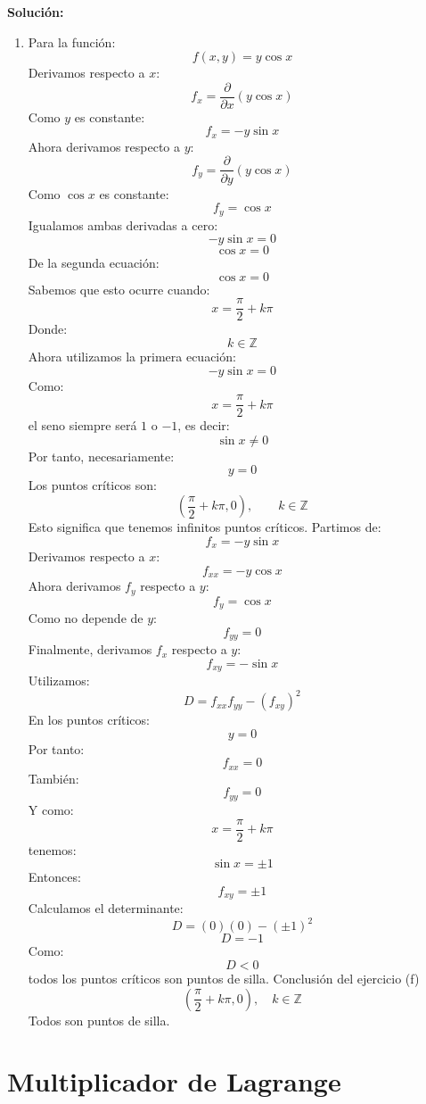 \documentclass[12pt,a4paper]{report}
\newcommand{\solutionname}{Solución:}
\newenvironment{solution}{
 	\par\noindent\textbf{\color{structurecolor}\solutionname}
 	\color{black!90}}{\hfill\quad\par}
\begin{document}
\begin{solution}
\begin{enumerate}
\item[f)] Para la función:
\[
f(x,y)=y\cos x
\]
Derivamos respecto a \(x\):
\[
f_x=\frac{\partial}{\partial x}(y\cos x)
\]
Como \(y\) es constante:
\[
f_x=-y\sin x
\]
Ahora derivamos respecto a \(y\):
\[
f_y=\frac{\partial}{\partial y}(y\cos x)
\]
Como \(\cos x\) es constante:
\[
f_y=\cos x
\]
Igualamos ambas derivadas a cero:
\[
-y\sin x=0
\]
\[
\cos x=0
\]
De la segunda ecuación:
\[
\cos x=0
\]
Sabemos que esto ocurre cuando:
\[
x=\frac{\pi}{2}+k\pi
\]
Donde:
\[
k\in\mathbb Z
\]
Ahora utilizamos la primera ecuación:
\[
-y\sin x=0
\]
Como:
\[
x=\frac{\pi}{2}+k\pi
\]
el seno siempre será \(1\) o \(-1\), es decir:
\[
\sin x\neq0
\]
Por tanto, necesariamente:
\[
y=0
\]
Los puntos críticos son:
\[
\left(\frac{\pi}{2}+k\pi,0\right),
\qquad k\in\mathbb Z
\]
Esto significa que tenemos infinitos puntos críticos.
Partimos de:
\[
f_x=-y\sin x
\]
Derivamos respecto a \(x\):
\[
f_{xx}=-y\cos x
\]
Ahora derivamos \(f_y\) respecto a \(y\):
\[
f_y=\cos x
\]
Como no depende de \(y\):
\[
f_{yy}=0
\]
Finalmente, derivamos \(f_x\) respecto a \(y\):
\[
f_{xy}=-\sin x
\]
Utilizamos:
\[
D=f_{xx}f_{yy}-(f_{xy})^2
\]
En los puntos críticos:
\[
y=0
\]
Por tanto:
\[
f_{xx}=0
\]
También:
\[
f_{yy}=0
\]
Y como:
\[
x=\frac{\pi}{2}+k\pi
\]
tenemos:
\[
\sin x=\pm1
\]
Entonces:
\[
f_{xy}=\pm1
\]
Calculamos el determinante:
\[
D=(0)(0)-(\pm1)^2
\]
\[
D=-1
\]
Como:
\[
D<0
\]
todos los puntos críticos son puntos de silla.
Conclusión del ejercicio (f)
\[
\left(\frac{\pi}{2}+k\pi,0\right),
\quad k\in\mathbb Z
\]
Todos son puntos de silla.
	
\end{enumerate}
\end{solution}

\chapter{Multiplicador de Lagrange}
\end{document}
